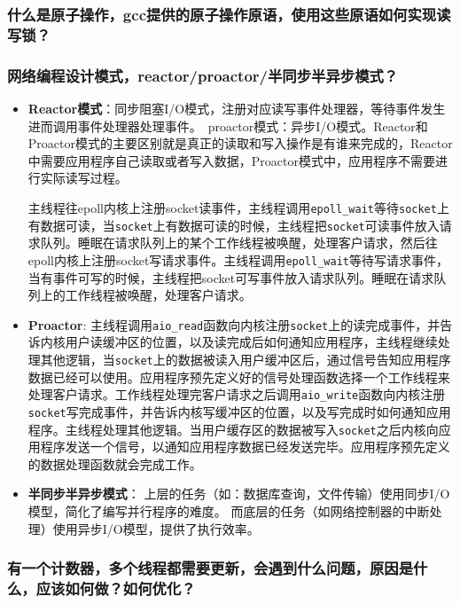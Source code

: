 \documentclass[UTF8,a4paper,8pt]{ctexart}
\begin{document}
		\subsubsection{什么是原子操作，gcc提供的原子操作原语，使用这些原语如何实现读写锁？}
		
		\subsubsection{网络编程设计模式，reactor/proactor/半同步半异步模式？}
			\begin{itemize}
				\item \textbf{Reactor模式}：同步阻塞I/O模式，注册对应读写事件处理器，等待事件发生进而调用事件处理器处理事件。 proactor模式：异步I/O模式。Reactor和Proactor模式的主要区别就是真正的读取和写入操作是有谁来完成的，Reactor中需要应用程序自己读取或者写入数据，Proactor模式中，应用程序不需要进行实际读写过程。
				
				主线程往epoll内核上注册socket读事件，主线程调用\verb|epoll_wait|等待\verb|socket|上有数据可读，当\verb|socket|上有数据可读的时候，主线程把\verb|socket|可读事件放入请求队列。睡眠在请求队列上的某个工作线程被唤醒，处理客户请求，然后往epoll内核上注册socket写请求事件。主线程调用\verb|epoll_wait|等待写请求事件，当有事件可写的时候，主线程把socket可写事件放入请求队列。睡眠在请求队列上的工作线程被唤醒，处理客户请求。
				\item \textbf{Proactor}:
				主线程调用\verb|aio_read|函数向内核注册\verb|socket|上的读完成事件，并告诉内核用户读缓冲区的位置，以及读完成后如何通知应用程序，主线程继续处理其他逻辑，当\verb|socket|上的数据被读入用户缓冲区后，通过信号告知应用程序数据已经可以使用。应用程序预先定义好的信号处理函数选择一个工作线程来处理客户请求。工作线程处理完客户请求之后调用\verb|aio_write|函数向内核注册\verb|socket|写完成事件，并告诉内核写缓冲区的位置，以及写完成时如何通知应用程序。主线程处理其他逻辑。当用户缓存区的数据被写入\verb|socket|之后内核向应用程序发送一个信号，以通知应用程序数据已经发送完毕。应用程序预先定义的数据处理函数就会完成工作。
				
				\item \textbf{半同步半异步模式}：
				上层的任务（如：数据库查询，文件传输）使用同步I/O模型，简化了编写并行程序的难度。
				而底层的任务（如网络控制器的中断处理）使用异步I/O模型，提供了执行效率。
			\end{itemize}
			
	
			
		\subsubsection{有一个计数器，多个线程都需要更新，会遇到什么问题，原因是什么，应该如何做？如何优化？}
		
\end{document}
